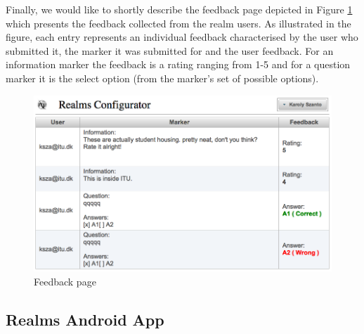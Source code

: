\noindent Finally, we would like to shortly describe the feedback page depicted in Figure \ref{fig.feedback} which presents the feedback collected from the realm users. As illustrated in the figure, each entry represents an individual feedback characterised by the user who submitted it, the marker it was submitted for and the user feedback. For an information marker the feedback is a rating ranging from 1-5 and for a question marker it is the select option (from the marker's set of possible options).
\begin{figure}[H] 
	\centering
	\includegraphics[width=\linewidth]{fig/feedback.png}
	\caption{Feedback page}
	\label{fig.feedback}
\end{figure}


\subsection{Realms Android App}
